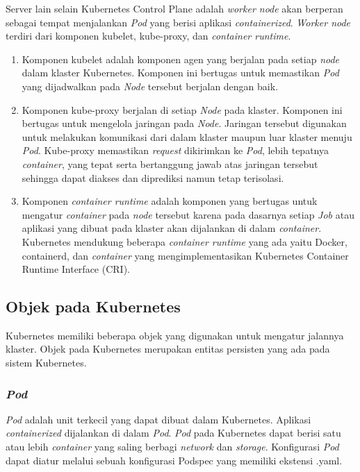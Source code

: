 Server lain selain Kubernetes Control Plane adalah \emph{worker node}
akan berperan sebagai tempat menjalankan \emph{Pod} yang berisi aplikasi
\emph{containerized}. \emph{Worker node} terdiri dari komponen kubelet, kube-proxy,
dan \emph{container runtime}.

\begin{enumerate}[itemsep=-0.2cm, topsep=-0.3cm]
  \item{Komponen kubelet adalah komponen agen yang berjalan pada
    setiap \emph{node} dalam klaster Kubernetes. Komponen ini bertugas untuk
    memastikan \emph{Pod} yang dijadwalkan pada \emph{Node} tersebut berjalan
    dengan baik.
  }
  \item{Komponen kube-proxy berjalan di setiap \emph{Node} pada
    klaster. Komponen ini bertugas untuk mengelola jaringan pada \emph{Node}.
    Jaringan tersebut digunakan untuk melakukan komunikasi dari dalam klaster
    maupun luar klaster menuju \emph{Pod}. Kube-proxy memastikan \emph{request}
    dikirimkan ke \emph{Pod}, lebih tepatnya \emph{container}, yang tepat serta bertanggung
    jawab atas jaringan tersebut sehingga dapat diakses dan diprediksi namun tetap terisolasi.
  }
  \item{Komponen \emph{container runtime} adalah komponen yang bertugas
    untuk mengatur \emph{container} pada \emph{node} tersebut karena pada dasarnya setiap
    \emph{Job} atau aplikasi yang dibuat pada klaster akan dijalankan di dalam \emph{container}.
    Kubernetes mendukung beberapa \emph{container runtime} yang ada yaitu Docker, containerd, dan
    \emph{container} yang mengimplementasikan Kubernetes Container Runtime Interface (CRI).
  }
\end{enumerate}

\subsection{Objek pada Kubernetes}

Kubernetes memiliki beberapa objek yang digunakan untuk mengatur jalannya
klaster. Objek pada Kubernetes merupakan entitas persisten yang ada pada sistem
Kubernetes. 

\subsubsection{\emph{Pod}}

\emph{Pod} adalah unit terkecil yang dapat dibuat dalam Kubernetes. Aplikasi
\emph{containerized} dijalankan di dalam \emph{Pod}. \emph{Pod} pada Kubernetes
dapat berisi satu atau lebih \emph{container} yang saling berbagi \emph{network}
dan \emph{storage}. Konfigurasi \emph{Pod} dapat diatur melalui sebuah konfigurasi
Podspec yang memiliki ekstensi .yaml.

